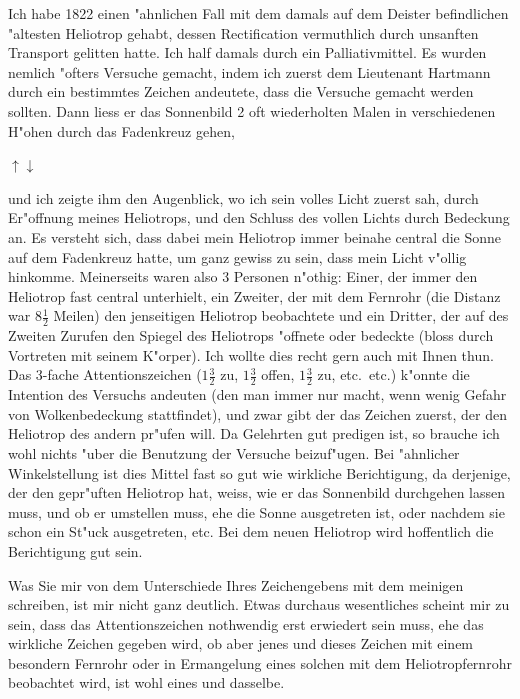 \documentclass[12pt,a4paper]{article}
\theoremstyle{plain}
\theoremstyle{definition}
\theoremstyle{remark}
\begin{document}
\newpage
\noindent Ich habe 1822 einen "ahnlichen Fall mit dem damals auf dem Deister befindlichen "altesten Heliotrop gehabt, dessen Rectification vermuthlich durch unsanften Transport gelitten hatte. Ich half damals durch ein Palliativmittel. Es wurden nemlich "ofters Versuche gemacht, indem ich zuerst dem Lieutenant Hartmann durch ein bestimmtes Zeichen andeutete, dass die Versuche gemacht werden sollten. Dann liess er das Sonnenbild 2 oft wiederholten Malen in verschiedenen H"ohen durch das Fadenkreuz gehen,
\begin{center}
$\uparrow\downarrow$
\end{center}
und ich zeigte ihm den Augenblick, wo ich sein volles Licht zuerst sah, durch Er"offnung meines Heliotrops, und den Schluss des vollen Lichts durch Bedeckung an. Es versteht sich, dass dabei mein Heliotrop immer beinahe central die Sonne auf dem Fadenkreuz hatte, um ganz gewiss zu sein, dass mein Licht v"ollig hinkomme. Meinerseits waren also 3 Personen n"othig: Einer, der immer den Heliotrop fast central unterhielt, ein Zweiter, der mit dem Fernrohr (die Distanz war $8\frac{1}{2}$ Meilen) den jenseitigen Heliotrop beobachtete und ein Dritter, der auf des Zweiten Zurufen den Spiegel des Heliotrops "offnete oder bedeckte (bloss durch Vortreten mit seinem K"orper). Ich wollte dies recht gern auch mit Ihnen thun. Das 3-fache Attentionszeichen ($1\frac{3}{2}$ zu, $1\frac{3}{2}$ offen, $1\frac{3}{2}$ zu, etc.\ etc.) k"onnte die Intention des Versuchs andeuten (den man immer nur macht, wenn wenig Gefahr von Wolkenbedeckung stattfindet), und zwar gibt der das Zeichen zuerst, der den Heliotrop des andern pr"ufen will. Da Gelehrten gut predigen ist, so brauche ich wohl nichts "uber die Benutzung der Versuche beizuf"ugen. Bei "ahnlicher Winkelstellung ist dies Mittel fast so gut wie wirkliche Berichtigung, da derjenige, der den gepr"uften Heliotrop hat, weiss, wie er das Sonnenbild durchgehen lassen muss, und ob er umstellen muss, ehe die Sonne ausgetreten ist, oder nachdem sie schon ein St"uck ausgetreten, etc. Bei dem neuen Heliotrop wird hoffentlich die Berichtigung gut sein.

\newpage
\noindent Was Sie mir von dem Unterschiede Ihres Zeichengebens mit dem meinigen schreiben, ist mir nicht ganz deutlich. Etwas durchaus wesentliches scheint mir zu sein, dass das Attentionszeichen nothwendig erst erwiedert sein muss, ehe das wirkliche Zeichen gegeben wird, ob aber jenes und dieses Zeichen mit einem besondern Fernrohr oder in Ermangelung eines solchen mit dem Heliotropfernrohr beobachtet wird, ist wohl eines und dasselbe.
\end{document}
